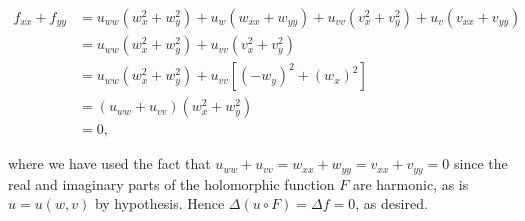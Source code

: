 \begin{solution}
  \begin{align*}
    f_{xx} + f_{yy} &= u_{ww} \left(w_x^2 + w_y^2 \right) 
                       + u_w \left(w_{xx} + w_{yy} \right)
                       + u_{vv} \left(v_x^2 + v_y^2 \right)
                       + u_v \left(v_{xx} + v_{yy} \right) \\
                    &= u_{ww} \left(w_x^2 + w_y^2 \right) + u_{vv} \left(v_x^2 + v_y^2 \right) \\
                    &= u_{ww} \left(w_x^2 + w_y^2 \right) + u_{vv} \left[(-w_y)^2 + (w_x)^2 \right] \\
                    &= \left(u_{ww} + u_{vv}\right) \left(w_x^2 + w_y^2 \right) \\
                    &= 0,
  \end{align*}

  where we have used the fact that $u_{ww} + u_{vv} = w_{xx} + w_{yy} = v_{xx} + v_{yy} = 0$ since the real and 
  imaginary parts of the holomorphic function $F$ are harmonic, as is $u = u(w, v)$ by hypothesis. Hence 
  $\Delta (u \circ F) = \Delta f = 0$, as desired.
  \ \\
\end{solution}

